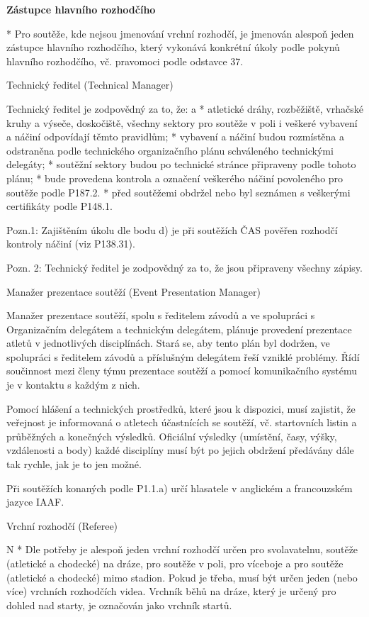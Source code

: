 {\bf Zástupce hlavního rozhodčího}

* Pro soutěže, kde nejsou jmenování vrchní rozhodčí, je jmenován alespoň jeden zástupce hlavního rozhodčího, který vykonává konkrétní úkoly podle pokynů hlavního rozhodčího, vč. pravomoci podle odstavce 37.
\enditems

\secc Technický ředitel (Technical Manager)

Technický ředitel je zodpovědný za to, že:
\begitems \style a
* atletické dráhy, rozběžiště, vrhačské kruhy a výseče, doskočiště, všechny sektory pro soutěže v poli i veškeré vybavení a náčiní odpovídají těmto pravidlům;
* vybavení a náčiní budou rozmístěna a odstraněna podle technického organizačního plánu schváleného technickými delegáty;
* soutěžní sektory budou po technické stránce připraveny podle tohoto plánu;
* bude provedena kontrola a označení veškerého náčiní povoleného pro soutěže podle P187.2.
* před soutěžemi obdržel nebo byl seznámen s veškerými certifikáty podle P148.1.
\enditems

Pozn.1: Zajištěním úkolu dle bodu d) je při soutěžích ČAS pověřen rozhodčí kontroly náčiní (viz P138.31).

Pozn. 2: Technický ředitel je zodpovědný za to, že jsou připraveny všechny zápisy.

\secc Manažer prezentace soutěží (Event Presentation Manager)

Manažer prezentace soutěží, spolu s ředitelem závodů a ve spolupráci s Organizačním delegátem a technickým delegátem, plánuje provedení prezentace atletů v jednotlivých disciplínách.
Stará se, aby tento plán byl dodržen, ve spolupráci s ředitelem závodů a příslušným delegátem řeší vzniklé problémy.
Řídí součinnost mezi členy týmu prezentace soutěží a pomocí komunikačního systému je v kontaktu s každým z nich.

Pomocí hlášení a technických prostředků, které jsou k dispozici, musí zajistit, že veřejnost je informovaná o atletech účastnících se soutěží, vč. startovních listin a průběžných a konečných výsledků.
Oficiální výsledky (umístění, časy, výšky, vzdálenosti a body) každé disciplíny musí být po jejich obdržení předávány dále tak rychle, jak je to jen možné.

Při soutěžích konaných podle P1.1.a) určí hlasatele v anglickém a francouzském jazyce IAAF.

\secc Vrchní rozhodčí (Referee)

\begitems \style N
* Dle potřeby je alespoň jeden vrchní rozhodčí určen pro svolavatelnu, soutěže (atletické a chodecké) na dráze, pro soutěže v poli, pro víceboje a pro soutěže (atletické a chodecké) mimo stadion. Pokud je třeba, musí být určen jeden (nebo více) vrchních rozhodčích videa. Vrchník běhů na dráze, který je určený pro dohled nad starty, je označován jako vrchník startů.

